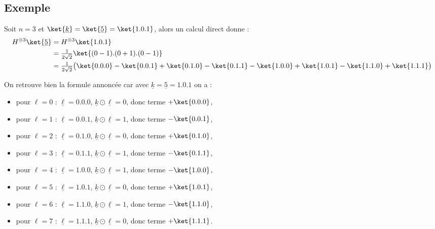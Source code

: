 \documentclass[11pt,class=report,crop=false]{standalone}
\begin{document}
\subsection{Exemple}


\begin{exemple}
Soit $n=3$ et $\ket{\underline{k}} = \ket{\underline{5}} = \ket{1.0.1}$, alors
un calcul direct donne :
\begin{align*}
H^{\otimes 3} \ket{\underline{5}} 
  &= H^{\otimes 3}\ket{1.0.1} \\
  &= \tfrac{1}{2\sqrt2} \ket{(0-1).(0+1).(0-1)} \\
  &= \tfrac{1}{2\sqrt2}\big( \ket{0.0.0} - \ket{0.0.1} + \ket{0.1.0} - \ket{0.1.1} 
-  \ket{1.0.0} + \ket{1.0.1} - \ket{1.1.0} + \ket{1.1.1}\big) \\
\end{align*}

On retrouve bien la formule annoncée car avec $\underline{k} = \underline{5} = 1.0.1$ on a :
\begin{itemize}
	\item pour $\ell = 0$ : $\underline\ell = 0.0.0$, $\underline k \odot \underline{\ell} = 0$, donc terme $+\ket{0.0.0}$,
	\item pour $\ell = 1$ : $\underline\ell = 0.0.1$, $\underline k \odot \underline{\ell} = 1$, donc terme $-\ket{0.0.1}$,
	\item pour $\ell = 2$ : $\underline\ell = 0.1.0$, $\underline k \odot \underline{\ell} = 0$, donc terme $+\ket{0.1.0}$,
	\item pour $\ell = 3$ : $\underline\ell = 0.1.1$, $\underline k \odot \underline{\ell} = 1$, donc terme $-\ket{0.1.1}$,
	\item pour $\ell = 4$ : $\underline\ell = 1.0.0$, $\underline k \odot \underline{\ell} = 1$, donc terme $-\ket{1.0.0}$,
	\item pour $\ell = 5$ : $\underline\ell = 1.0.1$, $\underline k \odot \underline{\ell} = 0$, donc terme $+\ket{1.0.1}$,
	\item pour $\ell = 6$ : $\underline\ell = 1.1.0$, $\underline k \odot \underline{\ell} = 1$, donc terme $-\ket{1.1.0}$,
	\item pour $\ell = 7$ : $\underline\ell = 1.1.1$, $\underline k \odot \underline{\ell} = 0$, donc terme $+\ket{1.1.1}$.
\end{itemize}
\end{exemple}
\end{document}
